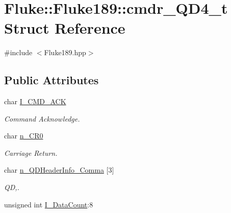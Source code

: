 \hypertarget{structFluke_1_1Fluke189_1_1cmdr__QD4__t}{
\section{Fluke::Fluke189::cmdr\_\-QD4\_\-t Struct Reference}
\label{structFluke_1_1Fluke189_1_1cmdr__QD4__t}
}


{\ttfamily \#include $<$Fluke189.hpp$>$}\subsection*{Public Attributes}
\begin{DoxyCompactItemize}
\item 
\hypertarget{structFluke_1_1Fluke189_1_1cmdr__QD4__t_aa18ec78c1a82952fc5fa36c41b278902}{
char \hyperlink{structFluke_1_1Fluke189_1_1cmdr__QD4__t_aa18ec78c1a82952fc5fa36c41b278902}{I\_\-CMD\_\-ACK}}
\label{structFluke_1_1Fluke189_1_1cmdr__QD4__t_aa18ec78c1a82952fc5fa36c41b278902}

\begin{DoxyCompactList}\small\item\em Command Acknowledge. \item\end{DoxyCompactList}\item 
\hypertarget{structFluke_1_1Fluke189_1_1cmdr__QD4__t_a556b63099f587c3f03ab639394d787af}{
char \hyperlink{structFluke_1_1Fluke189_1_1cmdr__QD4__t_a556b63099f587c3f03ab639394d787af}{n\_\-CR0}}
\label{structFluke_1_1Fluke189_1_1cmdr__QD4__t_a556b63099f587c3f03ab639394d787af}

\begin{DoxyCompactList}\small\item\em Carriage Return. \item\end{DoxyCompactList}\item 
\hypertarget{structFluke_1_1Fluke189_1_1cmdr__QD4__t_a96d95cc882250e4f46c6a8a7e99d3abf}{
char \hyperlink{structFluke_1_1Fluke189_1_1cmdr__QD4__t_a96d95cc882250e4f46c6a8a7e99d3abf}{n\_\-QDHeaderInfo\_\-Comma} \mbox{[}3\mbox{]}}
\label{structFluke_1_1Fluke189_1_1cmdr__QD4__t_a96d95cc882250e4f46c6a8a7e99d3abf}

\begin{DoxyCompactList}\small\item\em QD,. \item\end{DoxyCompactList}\item 
\hypertarget{structFluke_1_1Fluke189_1_1cmdr__QD4__t_a30efa6785e158b207d299cf6ea4fe6e6}{
unsigned int \hyperlink{structFluke_1_1Fluke189_1_1cmdr__QD4__t_a30efa6785e158b207d299cf6ea4fe6e6}{I\_\-DataCount}:8}
\label{structFluke_1_1Fluke189_1_1cmdr__QD4__t_a30efa6785e158b207d299cf6ea4fe6e6}


\end{DoxyCompactItemize}
